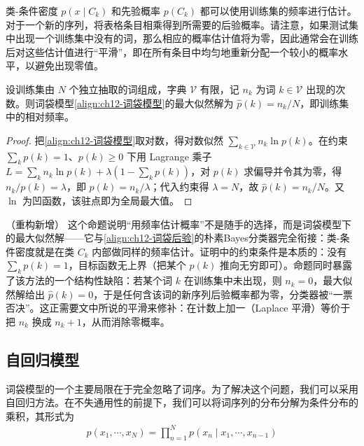 \documentclass[../../main.tex]{subfiles}
\begin{document}
类-条件密度 $p(x\mid C_k)$ 和先验概率 $p(C_k)$ 都可以使用训练集的频率进行估计。对于一个新的序列，将表格条目相乘得到所需要的后验概率。请注意，如果测试集中出现一个训练集中没有的词，那么相应的概率估计值将为零，因此通常会在训练后对这些估计值进行“平滑”，即在所有条目中均匀地重新分配一个较小的概率水平，以避免出现零值。

\begin{proposition}[词袋模型的最大似然解]\label{proposition:ch12-词袋最大似然}
设训练集由 $N$ 个独立抽取的词组成，字典 $\mathcal{V}$ 有限，记 $n_k$ 为词 $k\in\mathcal{V}$ 出现的次数。则词袋模型\eqref{align:ch12-词袋模型}的最大似然解为 $\hat{p}(k)=n_k/N$，即训练集中的相对频率。
\end{proposition}

\begin{proof}
把\eqref{align:ch12-词袋模型}取对数，得对数似然 $\sum_{k\in\mathcal{V}}n_k\ln p(k)$。在约束 $\sum_{k}p(k)=1$、$p(k)\geqslant0$ 下用 Lagrange 乘子 $L=\sum_k n_k\ln p(k)+\lambda\left(1-\sum_k p(k)\right)$，对 $p(k)$ 求偏导并令其为零，得 $n_k/p(k)=\lambda$，即 $p(k)=n_k/\lambda$；代入约束得 $\lambda=N$，故 $\hat{p}(k)=n_k/N$。又 $\ln$ 为凹函数，该驻点即为全局最大值。
\end{proof}

\begin{remark}（重构新增）
这个命题说明“用频率估计概率”不是随手的选择，而是词袋模型下的最大似然解——它与\eqref{align:ch12-词袋后验}的朴素Bayes分类器完全衔接：类-条件密度就是在类 $C_k$ 内部做同样的频率估计。证明中的约束条件是本质的：没有 $\sum_k p(k)=1$，目标函数无上界（把某个 $p(k)$ 推向无穷即可）。命题同时暴露了该方法的一个结构性缺陷：若某个词 $k$ 在训练集中未出现，则 $n_k=0$，最大似然解给出 $\hat{p}(k)=0$，于是任何含该词的新序列后验概率都为零，分类器被“一票否决”。这正需要文中所说的平滑来修补：在计数上加一（Laplace 平滑）等价于把 $n_k$ 换成 $n_k+1$，从而消除零概率。
\end{remark}

\subsection{自回归模型}\label{subsection:ch12-自回归模型}

词袋模型的一个主要局限在于完全忽略了词序。为了解决这个问题，我们可以采用自回归方法。在不失通用性的前提下，我们可以将词序列的分布分解为条件分布的乘积，其形式为
\begin{align}
p(x_1,\cdots,x_N)=\prod_{n=1}^{N}p(x_n\mid x_1,\cdots,x_{n-1})
\label{align:ch12-自回归语言模型}
\end{align}
\end{document}
